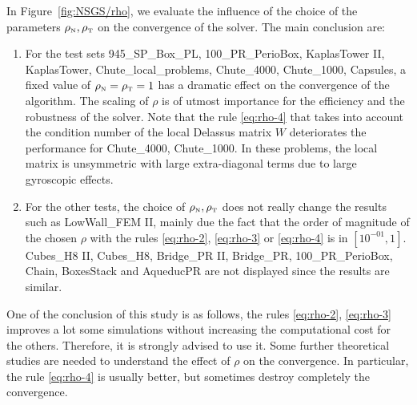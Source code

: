 In Figure~\ref{fig:NSGS/rho}, we evaluate the influence of the choice of the parameters $\rho_{\hbox{\tiny{N}}}, \rho_{\hbox{\tiny{T}}}$ on the convergence of the solver. The main conclusion are:
\begin{enumerate}
\item For the test sets 945\_SP\_Box\_PL, 100\_PR\_PerioBox, KaplasTower II, KaplasTower, Chute\_local\_problems, Chute\_4000, Chute\_1000, Capsules, a fixed value of $\rho_{\hbox{\tiny{N}}}=\rho_{\hbox{\tiny{T}}}=1$ has a dramatic effect on the convergence of the algorithm. The scaling of $\rho$ is of utmost importance for the efficiency and the robustness of the solver. Note that the rule  \eqref{eq:rho-4} that takes into account the condition number of the local Delassus matrix $W$ deteriorates the performance for  Chute\_4000, Chute\_1000. In these problems, the local matrix is unsymmetric with large extra-diagonal terms due to large gyroscopic effects.
  
\item For the other tests, the choice of $\rho_{\hbox{\tiny{N}}},\rho_{\hbox{\tiny{T}}}$ does not really change the results such as LowWall\_FEM II, mainly due the fact that the order of magnitude of the chosen $\rho$ with the rules \eqref{eq:rho-2}, \eqref{eq:rho-3} or \eqref{eq:rho-4} is in $[10^{-01}, 1]$. Cubes\_H8 II, Cubes\_H8, Bridge\_PR II, Bridge\_PR, 100\_PR\_PerioBox, Chain, BoxesStack and AqueducPR are not displayed since the results are similar.
\end{enumerate}
One of the conclusion of this study is as follows, the rules \eqref{eq:rho-2}, \eqref{eq:rho-3} improves a lot some simulations without increasing the computational cost for the others. Therefore, it is strongly advised to use it. Some further theoretical studies are needed to understand the effect of $\rho$ on the convergence. In particular, the rule \eqref{eq:rho-4} is usually better, but sometimes destroy completely the convergence.
